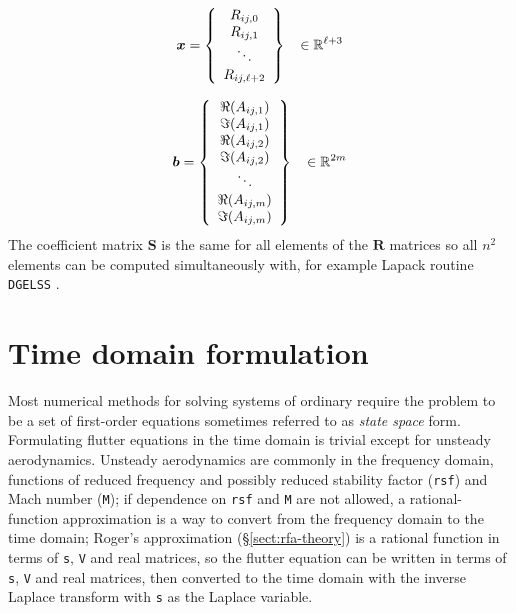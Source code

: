 \documentclass[11pt,openany,twoside]{book}
\numberwithin{equation}{section}		%
\newcommand{\Newterm}[1]{{\em #1}}	%
\newcommand{\Code}[1]{{\small\tt #1}}
\newcommand{\Matrix}[1]{\boldsymbol{#1}}
\newcommand{\Sectref}[1]{\S\ref{#1}}
\begin{document}
\begin{displaymath}
\Matrix{x} = \left\{
\begin{array}{c}
R_{ij,0} \\
R_{ij,1}  \\
\ddots  \\
R_{ij,\ell+2}
\end{array}
\right\}		\hspace{3mm} \in \mathbb{R}^{\ell+3}
\end{displaymath}

\begin{displaymath}
 \Matrix{b} =
\left\{
\begin{array}{c}
\Re(A_{ij,1}) \\
\Im(A_{ij,1}) \\
\Re(A_{ij,2}) \\
\Im(A_{ij,2}) \\
\ddots \\
\Re(A_{ij,m}) \\
\Im(A_{ij,m})
\end{array}
\right\}		\hspace{3mm} \in \mathbb{R}^{2m}
\end{displaymath}
The coefficient matrix $\Matrix{S}$ is the same for all elements of the
$\Matrix{R}$ matrices so all $n^2$ elements can be computed simultaneously
with, for example Lapack routine \Code{DGELSS} \cite{anderson1999lapack}.

\section{Time domain formulation}\label{sect:timedomain}
Most numerical methods for solving systems of ordinary require the
problem to be a set of first-order equations
sometimes referred to as \Newterm{state space} form.
Formulating flutter equations in the time domain is trivial except for unsteady
aerodynamics. Unsteady aerodynamics are commonly in the frequency domain,
functions of reduced frequency and possibly reduced stability factor (\Code{rsf}) and
Mach number (\Code{M}); if dependence on \Code{rsf} and \Code{M} are not allowed,
a rational-function approximation is a way to convert from the frequency domain to the
time domain; Roger's approximation\cite{roger1977airplane}
(\Sectref{sect:rfa-theory}) is a rational function
in terms of \Code{s}, \Code{V} and real matrices, so the flutter equation can
be written in terms of \Code{s}, \Code{V} and real matrices, then converted
to the time domain with the inverse Laplace transform with \Code{s} as the Laplace
variable.
\end{document}
